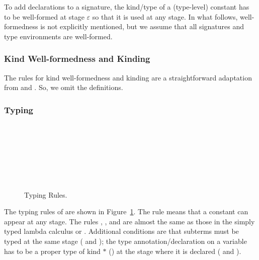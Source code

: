 To add declarations to a signature, the kind/type of a (type-level) constant
has to be well-formed at stage \(\varepsilon\) so that it is used at any stage.
In what follows, well-formedness is not explicitly mentioned, but we assume
that all signatures and type environments are well-formed.

\subsubsection{Kind Well-formedness and Kinding}

The rules for kind well-formedness and kinding are a straightforward adaptation
from \LLF and \LTP. So, we omit the definitions.

\subsubsection{Typing}
\label{sec:typing}

\begin{figure}[tbp]
  \begin{center}
     \hfil
     \\[2mm]
     \\[2mm]
     \\[2mm]
     \\[2mm]
     \andalso
     \\[2mm]
     \\[2mm]
     \andalso
    \caption{Typing Rules.}
    \label{fig:typing-rules}
  \end{center}
\end{figure}

The typing rules of \LMD are shown in Figure~\ref{fig:typing-rules}.
The rule \TConst{} means that a constant can appear at any stage.
The rules \TVar, \TAbs, and \TApp{} are almost the same as those in the simply typed
lambda calculus or \LLF.  Additional conditions are that subterms must be
typed at the same stage (\TAbs{} and \TApp); the type
annotation/declaration on a variable has to be a proper type of kind
$*$ (\TAbs) at the stage where it is declared (\TVar{} and \TAbs).

